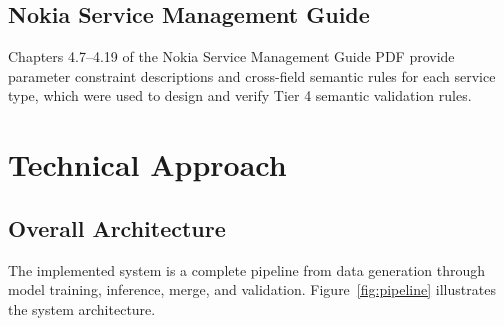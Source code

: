 \documentclass[12pt, a4paper]{article}
\begin{document}
\subsection{Nokia Service Management Guide}

Chapters 4.7--4.19 of the Nokia Service Management Guide PDF provide parameter constraint descriptions and cross-field semantic rules for each service type, which were used to design and verify Tier 4 semantic validation rules.

\section{Technical Approach}
\label{sec:approach}

\subsection{Overall Architecture}

The implemented system is a complete pipeline from data generation through model training, inference, merge, and validation. Figure~\ref{fig:pipeline} illustrates the system architecture.
\end{document}
